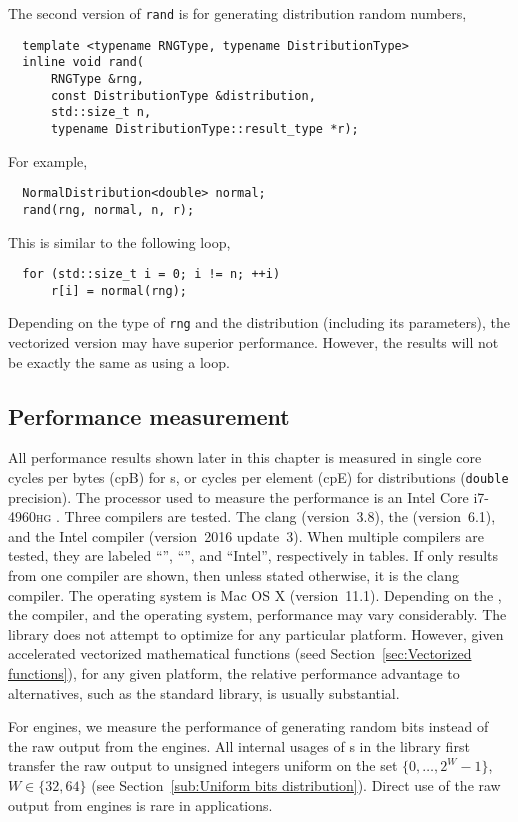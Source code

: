 The second version of \verb|rand| is for generating distribution random
numbers,
\begin{Verbatim}
  template <typename RNGType, typename DistributionType>
  inline void rand(
      RNGType &rng,
      const DistributionType &distribution,
      std::size_t n,
      typename DistributionType::result_type *r);
\end{Verbatim}
For example,
\begin{Verbatim}
  NormalDistribution<double> normal;
  rand(rng, normal, n, r);
\end{Verbatim}
This is similar to the following loop,
\begin{Verbatim}
  for (std::size_t i = 0; i != n; ++i)
      r[i] = normal(rng);
\end{Verbatim}
Depending on the type of \verb|rng| and the distribution (including its
parameters), the vectorized version may have superior performance. However, the
results will not be exactly the same as using a loop.

\subsection{Performance measurement}
\label{sub:Performance measurement}

All performance results shown later in this chapter is measured in single core
cycles per bytes (cpB) for \rng{}s, or cycles per element (cpE) for
distributions (\verb|double| precision). The processor used to measure the
performance is an Intel Core i7-4960\textsc{hg} \cpu. Three compilers are
tested. The \llvm clang (version~3.8), the \gnu{} \gcc (version~6.1), and the
Intel \cpp compiler (version~2016 update~3). When multiple compilers are
tested, they are labeled ``\llvm'', ``\gnu'', and ``Intel'', respectively in
tables. If only results from one compiler are shown, then unless stated
otherwise, it is the \llvm clang compiler. The operating system is Mac OS X
(version~11.1). Depending on the \cpu, the compiler, and the operating system,
performance may vary considerably. The library does not attempt to optimize for
any particular platform. However, given accelerated vectorized mathematical
functions (seed Section~\ref{sec:Vectorized functions}), for any given
platform, the relative performance advantage to alternatives, such as the
standard library, is usually substantial.

For \rng engines, we measure the performance of generating random bits instead
of the raw output from the engines. All internal usages of \rng{}s in the
library first transfer the raw output to unsigned integers uniform on the set
$\{0,\dots,2^W-1\}$, $W\in\{32,64\}$ (see Section~\ref{sub:Uniform bits
  distribution}). Direct use of the raw output from \rng engines is rare in
applications.

